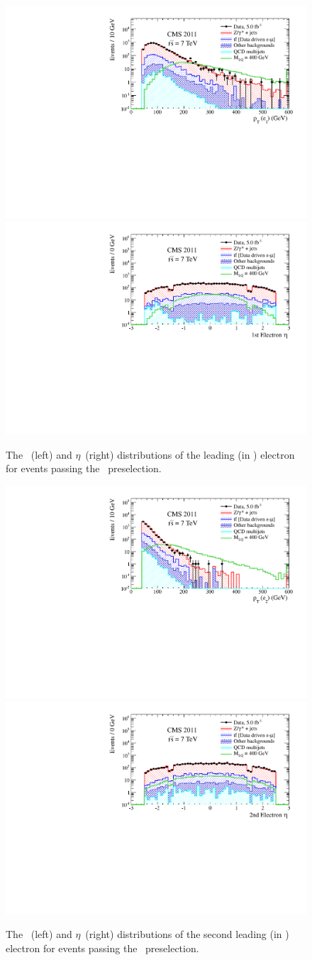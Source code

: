 \begin{figure}
  \begin{center}
    {\includegraphics[width=.49\textwidth]{tex/analysis/event_selection/fig/ee/preselection/Pt1stEle_PAS_eejj_WZSherpa_noNSigma.pdf}}
    {\includegraphics[width=.49\textwidth]{tex/analysis/event_selection/fig/ee/preselection/Eta1stEle_PAS_eejj_WZSherpa_noNSigma.pdf}}
    \caption{
      The \pt~(left) and $\eta$~(right) distributions of the leading
      (in \pt) electron for events passing the \eejj~preselection.
    }
    \label{fig:eejj_preselection_ele1}
  \end{center}
\end{figure}
\begin{figure}
  \begin{center}
    {\includegraphics[width=.49\textwidth]{tex/analysis/event_selection/fig/ee/preselection/Pt2ndEle_PAS_eejj_WZSherpa_noNSigma.pdf}}
    {\includegraphics[width=.49\textwidth]{tex/analysis/event_selection/fig/ee/preselection/Eta2ndEle_PAS_eejj_WZSherpa_noNSigma.pdf}}
    \caption{
      The \pt~(left) and $\eta$~(right) distributions of the second leading
      (in \pt) electron for events passing the \eejj~preselection.
    }
    \label{fig:eejj_preselection_ele2}
  \end{center}
\end{figure}


